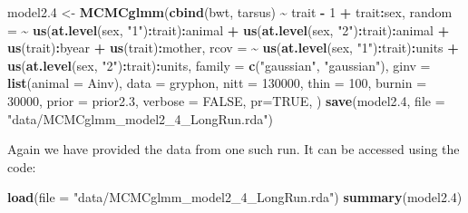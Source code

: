 \documentclass[
  12pt,
]{book}
\newenvironment{Shaded}{\begin{snugshade}}{\end{snugshade}}
\newcommand{\DataTypeTok}[1]{\textcolor[rgb]{0.13,0.29,0.53}{#1}}
\newcommand{\DecValTok}[1]{\textcolor[rgb]{0.00,0.00,0.81}{#1}}
\newcommand{\FloatTok}[1]{\textcolor[rgb]{0.00,0.00,0.81}{#1}}
\newcommand{\KeywordTok}[1]{\textcolor[rgb]{0.13,0.29,0.53}{\textbf{#1}}}
\newcommand{\NormalTok}[1]{#1}
\newcommand{\OperatorTok}[1]{\textcolor[rgb]{0.81,0.36,0.00}{\textbf{#1}}}
\newcommand{\OtherTok}[1]{\textcolor[rgb]{0.56,0.35,0.01}{#1}}
\newcommand{\StringTok}[1]{\textcolor[rgb]{0.31,0.60,0.02}{#1}}
\begin{document}
\begin{Shaded}
\begin{Highlighting}[]
\NormalTok{model2}\FloatTok{.4}\NormalTok{ \textless{}{-}}\StringTok{ }\KeywordTok{MCMCglmm}\NormalTok{(}\KeywordTok{cbind}\NormalTok{(bwt, tarsus) }\OperatorTok{\textasciitilde{}}\StringTok{ }\NormalTok{trait }\OperatorTok{{-}}\StringTok{ }\DecValTok{1} \OperatorTok{+}\StringTok{ }\NormalTok{trait}\OperatorTok{:}\NormalTok{sex,}
  \DataTypeTok{random =} \OperatorTok{\textasciitilde{}}\StringTok{ }\KeywordTok{us}\NormalTok{(}\KeywordTok{at.level}\NormalTok{(sex, }\StringTok{"1"}\NormalTok{)}\OperatorTok{:}\NormalTok{trait)}\OperatorTok{:}\NormalTok{animal }\OperatorTok{+}\StringTok{ }\KeywordTok{us}\NormalTok{(}\KeywordTok{at.level}\NormalTok{(sex, }\StringTok{"2"}\NormalTok{)}\OperatorTok{:}\NormalTok{trait)}\OperatorTok{:}\NormalTok{animal }\OperatorTok{+}\StringTok{ }\KeywordTok{us}\NormalTok{(trait)}\OperatorTok{:}\NormalTok{byear }\OperatorTok{+}\StringTok{ }\KeywordTok{us}\NormalTok{(trait)}\OperatorTok{:}\NormalTok{mother,}
  \DataTypeTok{rcov =} \OperatorTok{\textasciitilde{}}\StringTok{ }\KeywordTok{us}\NormalTok{(}\KeywordTok{at.level}\NormalTok{(sex, }\StringTok{"1"}\NormalTok{)}\OperatorTok{:}\NormalTok{trait)}\OperatorTok{:}\NormalTok{units }\OperatorTok{+}\StringTok{ }\KeywordTok{us}\NormalTok{(}\KeywordTok{at.level}\NormalTok{(sex, }\StringTok{"2"}\NormalTok{)}\OperatorTok{:}\NormalTok{trait)}\OperatorTok{:}\NormalTok{units,}
  \DataTypeTok{family =} \KeywordTok{c}\NormalTok{(}\StringTok{"gaussian"}\NormalTok{, }\StringTok{"gaussian"}\NormalTok{),}
  \DataTypeTok{ginv =} \KeywordTok{list}\NormalTok{(}\DataTypeTok{animal =}\NormalTok{ Ainv), }\DataTypeTok{data =}\NormalTok{ gryphon,}
  \DataTypeTok{nitt =} \DecValTok{130000}\NormalTok{, }\DataTypeTok{thin =} \DecValTok{100}\NormalTok{, }\DataTypeTok{burnin =} \DecValTok{30000}\NormalTok{,}
  \DataTypeTok{prior =}\NormalTok{ prior2}\FloatTok{.3}\NormalTok{, }\DataTypeTok{verbose =} \OtherTok{FALSE}\NormalTok{, }\DataTypeTok{pr=}\OtherTok{TRUE}\NormalTok{,}
\NormalTok{)}
\KeywordTok{save}\NormalTok{(model2}\FloatTok{.4}\NormalTok{, }\DataTypeTok{file =} \StringTok{"data/MCMCglmm\_model2\_4\_LongRun.rda"}\NormalTok{)}
\end{Highlighting}
\end{Shaded}

Again we have provided the data from one such run. It can be accessed using the code:

\begin{Shaded}
\begin{Highlighting}[]
\KeywordTok{load}\NormalTok{(}\DataTypeTok{file =} \StringTok{"data/MCMCglmm\_model2\_4\_LongRun.rda"}\NormalTok{)}
\KeywordTok{summary}\NormalTok{(model2}\FloatTok{.4}\NormalTok{)}
\end{Highlighting}
\end{Shaded}
\end{document}
